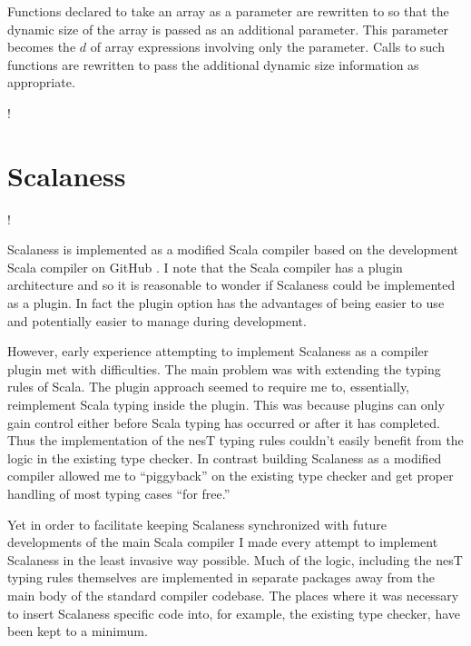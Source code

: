 
Functions declared to take an array as a parameter are rewritten to so that the dynamic size of
the array is passed as an additional parameter. This parameter becomes the $d$ of array
expressions involving only the parameter. Calls to such functions are rewritten to pass the
additional dynamic size information as appropriate.


\lstDeleteShortInline!

\section{Scalaness}
\label{section-scalaness-implementation}

\lstset{language=scalaness}
\lstMakeShortInline!

Scalaness is implemented as a modified Scala compiler based on the development Scala compiler on
GitHub \cite{XXX}. I note that the Scala compiler has a plugin architecture and so it is
reasonable to wonder if Scalaness could be implemented as a plugin. In fact the plugin option
has the advantages of being easier to use and potentially easier to manage during development.

However, early experience attempting to implement Scalaness as a compiler plugin met with
difficulties. The main problem was with extending the typing rules of Scala. The plugin approach
seemed to require me to, essentially, reimplement Scala typing inside the plugin. This was
because plugins can only gain control either before Scala typing has occurred or after it has
completed. Thus the implementation of the nesT typing rules couldn't easily benefit from the
logic in the existing type checker. In contrast building Scalaness as a modified compiler
allowed me to ``piggyback'' on the existing type checker and get proper handling of most typing
cases ``for free.''

Yet in order to facilitate keeping Scalaness synchronized with future developments of the main
Scala compiler I made every attempt to implement Scalaness in the least invasive way possible.
Much of the logic, including the nesT typing rules themselves are implemented in separate
packages away from the main body of the standard compiler codebase. The places where it was
necessary to insert Scalaness specific code into, for example, the existing type checker, have
been kept to a minimum.

